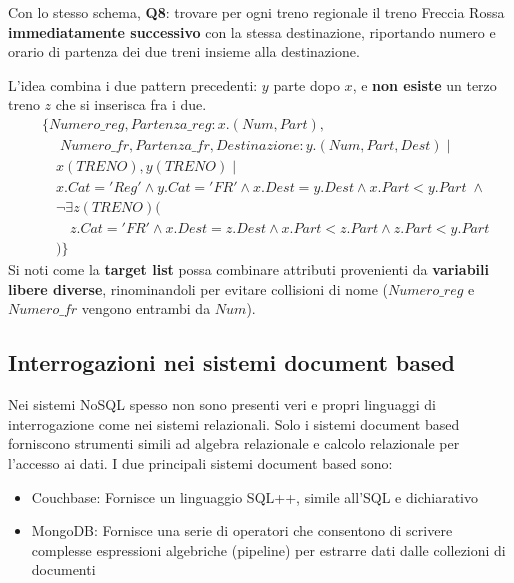 \documentclass[a4paper,twoside]{article}
\begin{document}
\begin{example}
  Con lo stesso schema, \textbf{Q8}: trovare per ogni treno regionale il treno Freccia
  Rossa \textbf{immediatamente successivo} con la stessa destinazione, riportando numero
  e orario di partenza dei due treni insieme alla destinazione.

  \vspace{1em}
  \noindent
  L'idea combina i due pattern precedenti: \( y \) parte dopo \( x \), e
  \textbf{non esiste} un terzo treno \( z \) che si inserisca fra i due.
  \[
    \begin{aligned}
      &\{ Numero\_reg, Partenza\_reg: x.(Num, Part),\\
      &\quad\; Numero\_fr, Partenza\_fr, Destinazione: y.(Num, Part, Dest) \mid \\
      &\quad x(TRENO), y(TRENO) \mid \\
      &\quad x.Cat = 'Reg' \land y.Cat = 'FR' \land
      x.Dest = y.Dest \land x.Part < y.Part \;\land\\
      &\quad \lnot \exists z(TRENO)(\\
      &\quad\quad z.Cat = 'FR' \land x.Dest = z.Dest \land
      x.Part < z.Part \land z.Part < y.Part\\
      &\quad )
      \}
    \end{aligned}
  \]
  Si noti come la \textbf{target list} possa combinare attributi provenienti da
  \textbf{variabili libere diverse}, rinominandoli per evitare collisioni di nome
  (\( Numero\_reg \) e \( Numero\_fr \) vengono entrambi da \( Num \)).
\end{example}

\subsection{Interrogazioni nei sistemi document based}
Nei sistemi NoSQL spesso non sono presenti veri e propri linguaggi di interrogazione come
nei sistemi relazionali. Solo i sistemi document based forniscono strumenti simili ad
algebra relazionale e calcolo relazionale per l'accesso ai dati. I due principali sistemi
document based sono:
\begin{itemize}
  \item Couchbase: Fornisce un linguaggio SQL++, simile all'SQL e dichiarativo
  \item MongoDB: Fornisce una serie di operatori che consentono di scrivere complesse
    espressioni algebriche (pipeline) per estrarre dati dalle collezioni di documenti
\end{itemize}
\end{document}
